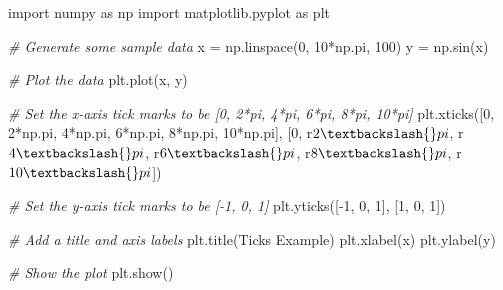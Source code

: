 \documentclass[11pt]{article}
\newenvironment{Shaded}{}{}
\newcommand{\DecValTok}[1]{\textcolor[rgb]{0.25,0.63,0.44}{{#1}}}
\newcommand{\StringTok}[1]{\textcolor[rgb]{0.25,0.44,0.63}{{#1}}}
\newcommand{\CommentTok}[1]{\textcolor[rgb]{0.38,0.63,0.69}{\textit{{#1}}}}
\newcommand{\NormalTok}[1]{{#1}}
\newcommand{\VerbatimStringTok}[1]{\textcolor[rgb]{0.25,0.44,0.63}{{#1}}}
\newcommand{\ImportTok}[1]{{#1}}
\newcommand{\OperatorTok}[1]{\textcolor[rgb]{0.40,0.40,0.40}{{#1}}}
\begin{document}
\begin{Shaded}
\begin{Highlighting}[]
\ImportTok{import}\NormalTok{ numpy }\ImportTok{as}\NormalTok{ np}
\ImportTok{import}\NormalTok{ matplotlib.pyplot }\ImportTok{as}\NormalTok{ plt}

\CommentTok{\# Generate some sample data}
\NormalTok{x }\OperatorTok{=}\NormalTok{ np.linspace(}\DecValTok{0}\NormalTok{, }\DecValTok{10}\OperatorTok{*}\NormalTok{np.pi, }\DecValTok{100}\NormalTok{)}
\NormalTok{y }\OperatorTok{=}\NormalTok{ np.sin(x)}

\CommentTok{\# Plot the data}
\NormalTok{plt.plot(x, y)}

\CommentTok{\# Set the x{-}axis tick marks to be [0, 2*pi, 4*pi, 6*pi, 8*pi, 10*pi]}
\NormalTok{plt.xticks([}\DecValTok{0}\NormalTok{, }\DecValTok{2}\OperatorTok{*}\NormalTok{np.pi, }\DecValTok{4}\OperatorTok{*}\NormalTok{np.pi, }\DecValTok{6}\OperatorTok{*}\NormalTok{np.pi, }\DecValTok{8}\OperatorTok{*}\NormalTok{np.pi, }\DecValTok{10}\OperatorTok{*}\NormalTok{np.pi], [}\StringTok{\textquotesingle{}0\textquotesingle{}}\NormalTok{, }\VerbatimStringTok{r\textquotesingle{}$2\textbackslash{}pi$\textquotesingle{}}\NormalTok{, }\VerbatimStringTok{r\textquotesingle{}$4\textbackslash{}pi$\textquotesingle{}}\NormalTok{, }\VerbatimStringTok{r\textquotesingle{}$6\textbackslash{}pi$\textquotesingle{}}\NormalTok{, }\VerbatimStringTok{r\textquotesingle{}$8\textbackslash{}pi$\textquotesingle{}}\NormalTok{, }\VerbatimStringTok{r\textquotesingle{}$10\textbackslash{}pi$\textquotesingle{}}\NormalTok{])}

\CommentTok{\# Set the y{-}axis tick marks to be [{-}1, 0, 1]}
\NormalTok{plt.yticks([}\OperatorTok{{-}}\DecValTok{1}\NormalTok{, }\DecValTok{0}\NormalTok{, }\DecValTok{1}\NormalTok{], [}\StringTok{\textquotesingle{}{-}1\textquotesingle{}}\NormalTok{, }\StringTok{\textquotesingle{}0\textquotesingle{}}\NormalTok{, }\StringTok{\textquotesingle{}1\textquotesingle{}}\NormalTok{])}

\CommentTok{\# Add a title and axis labels}
\NormalTok{plt.title(}\StringTok{\textquotesingle{}Ticks Example\textquotesingle{}}\NormalTok{)}
\NormalTok{plt.xlabel(}\StringTok{\textquotesingle{}x\textquotesingle{}}\NormalTok{)}
\NormalTok{plt.ylabel(}\StringTok{\textquotesingle{}y\textquotesingle{}}\NormalTok{)}

\CommentTok{\# Show the plot}
\NormalTok{plt.show()}
\end{Highlighting}
\end{Shaded}
\end{document}
